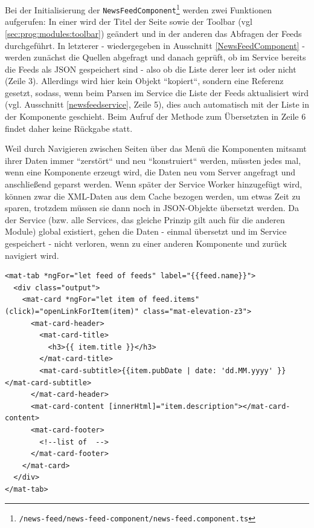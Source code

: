 Bei der Initialisierung der \texttt{NewsFeedComponent}\footnote{\texttt{/news-feed/news-feed-component/news-feed.component.ts}} werden zwei Funktionen aufgerufen: In einer wird  der Titel der Seite sowie der Toolbar (vgl \ref{sec:prog:modules:toolbar}) geändert und in der anderen das Abfragen der Feeds durchgeführt. In letzterer - wiedergegeben in Ausschnitt \ref{NewsFeedComponent} - werden zunächst die Quellen abgefragt und danach geprüft, ob im Service bereits die Feeds als \acs{JSON} gespeichert sind - also ob die Liste derer leer ist oder nicht (Zeile 3). Allerdings wird hier kein Objekt ``kopiert``, sondern eine Referenz gesetzt, sodass, wenn beim Parsen im Service die Liste der Feeds aktualisiert wird (vgl. Ausschnitt \ref{newsfeedservice}, Zeile 5), dies auch automatisch mit der Liste in der Komponente geschieht. Beim Aufruf der Methode zum Übersetzten in Zeile 6 findet daher keine Rückgabe statt.

Weil durch Navigieren zwischen Seiten über das Menü die Komponenten mitsamt ihrer Daten immer ``zerstört`` und neu ``konstruiert`` werden, müssten jedes mal, wenn eine Komponente erzeugt wird, die Daten neu vom Server angefragt und anschließend geparst werden. Wenn später der Service Worker hinzugefügt wird, können zwar die \acs{XML}-Daten aus dem Cache bezogen werden, um etwas Zeit zu sparen, trotzdem müssen sie dann noch in \acs{JSON}-Objekte übersetzt werden. Da der Service (bzw. alle Services, das gleiche Prinzip gilt auch für die anderen Module) global existiert, gehen die Daten  - einmal übersetzt und im Service gespeichert - nicht verloren, wenn zu einer anderen Komponente und zurück navigiert wird. 

\begin{lstlisting}[float, floatplacement=h, style=htmlcssjs, caption={Ausschnitt des NewsFeed-Templates}, label={news-feed.component.html}]
<mat-tab *ngFor="let feed of feeds" label="{{feed.name}}">
  <div class="output">
    <mat-card *ngFor="let item of feed.items" (click)="openLinkForItem(item)" class="mat-elevation-z3">
      <mat-card-header>
        <mat-card-title>
          <h3>{{ item.title }}</h3>
        </mat-card-title>
        <mat-card-subtitle>{{item.pubDate | date: 'dd.MM.yyyy' }}</mat-card-subtitle>
      </mat-card-header>
      <mat-card-content [innerHtml]="item.description"></mat-card-content>
      <mat-card-footer>
		<!--list of  -->
      </mat-card-footer>
    </mat-card>
  </div>
</mat-tab>
\end{lstlisting}

